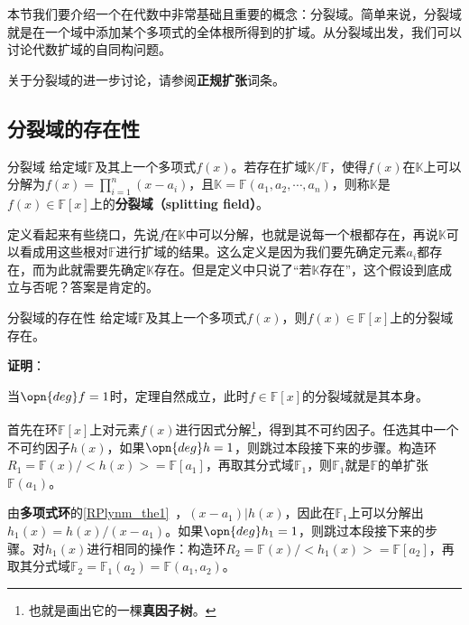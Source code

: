 



本节我们要介绍一个在代数中非常基础且重要的概念：分裂域。简单来说，分裂域就是在一个域中添加某个多项式的全体根所得到的扩域。从分裂域出发，我们可以讨论代数扩域的自同构问题。

关于分裂域的进一步讨论，请参阅\textbf{正规扩张}词条。


\subsection{分裂域的存在性}


\begin{definition}{分裂域}
给定域$\mathbb{F}$及其上一个多项式$f(x)$。若存在扩域$\mathbb{K}/\mathbb{F}$，使得$f(x)$在$\mathbb{K}$上可以分解为$f(x)=\prod_{i=1}^n (x-a_i)$，且$\mathbb{K}=\mathbb{F}(a_1, a_2, \cdots, a_n)$，则称$\mathbb{K}$是$f(x)\in \mathbb{F}[x]$上的\textbf{分裂域（splitting field）}。
\end{definition}

定义看起来有些绕口，先说$f$在$\mathbb{K}$中可以分解，也就是说每一个根都存在，再说$\mathbb{K}$可以看成用这些根对$\mathbb{F}$进行扩域的结果。这么定义是因为我们要先确定元素$a_i$都存在，而为此就需要先确定$\mathbb{K}$存在。但是定义中只说了“若$\mathbb{K}$存在”，这个假设到底成立与否呢？答案是肯定的。

\begin{theorem}{分裂域的存在性}
给定域$\mathbb{F}$及其上一个多项式$f(x)$，则$f(x)\in \mathbb{F}[x]$上的分裂域存在。
\end{theorem}

\textbf{证明}：

当$\opn{deg}f=1$时，定理自然成立，此时$f\in\mathbb{F}[x]$的分裂域就是其本身。

首先在环$\mathbb{F}[x]$上对元素$f(x)$进行因式分解\footnote{也就是画出它的一棵\textbf{真因子树}。}，得到其不可约因子。任选其中一个不可约因子$h(x)$，如果$\opn{deg} h = 1$，则跳过本段接下来的步骤。构造环$R_1=\mathbb{F}(x)/<h(x)>=\mathbb{F}[a_1]$，再取其分式域$\mathbb{F}_1$，则$\mathbb{F}_1$就是$\mathbb{F}$的单扩张$\mathbb{F}(a_1)$。

由\textbf{多项式环}的\autoref{RPlynm_the1}~，$(x-a_1)|h(x)$，因此在$\mathbb{F}_1$上可以分解出$h_1(x)=h(x)/(x-a_1)$。如果$\opn{deg}h_1 = 1$，则跳过本段接下来的步骤。对$h_1(x)$进行相同的操作：构造环$R_2=\mathbb{F}(x)/<h_1(x)>=\mathbb{F}[a_2]$，再取其分式域$\mathbb{F}_2=\mathbb{F}_1(a_2)=\mathbb{F}(a_1, a_2)$。

